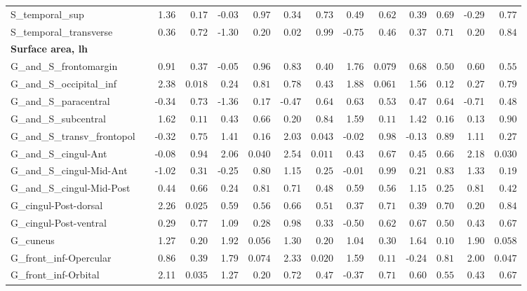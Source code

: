 {\begin{longtable}{llrrrrrrrrrrrr}
S\_temporal\_sup &  & 1.36 & $0.17$ & -0.03 & $0.97$ & 0.34 & $0.73$ & 0.49 & $0.62$ & 0.39 & $0.69$ & -0.29 & $0.77$ \\
S\_temporal\_transverse &  & 0.36 & $0.72$ & -1.30 & $0.20$ & 0.02 & $0.99$ & -0.75 & $0.46$ & 0.37 & $0.71$ & 0.20 & $0.84$ \\
\midrule\multicolumn{14}{l}{\textbf{Surface area, lh}} \\
G\_and\_S\_frontomargin &  & 0.91 & $0.37$ & -0.05 & $0.96$ & 0.83 & $0.40$ & 1.76 & $0.079$ & 0.68 & $0.50$ & 0.60 & $0.55$ \\
G\_and\_S\_occipital\_inf &  & 2.38 & $0.018$ & 0.24 & $0.81$ & 0.78 & $0.43$ & 1.88 & $0.061$ & 1.56 & $0.12$ & 0.27 & $0.79$ \\
G\_and\_S\_paracentral &  & -0.34 & $0.73$ & -1.36 & $0.17$ & -0.47 & $0.64$ & 0.63 & $0.53$ & 0.47 & $0.64$ & -0.71 & $0.48$ \\
G\_and\_S\_subcentral &  & 1.62 & $0.11$ & 0.43 & $0.66$ & 0.20 & $0.84$ & 1.59 & $0.11$ & 1.42 & $0.16$ & 0.13 & $0.90$ \\
G\_and\_S\_transv\_frontopol &  & -0.32 & $0.75$ & 1.41 & $0.16$ & 2.03 & $0.043$ & -0.02 & $0.98$ & -0.13 & $0.89$ & 1.11 & $0.27$ \\
G\_and\_S\_cingul-Ant &  & -0.08 & $0.94$ & 2.06 & $0.040$ & 2.54 & $0.011$ & 0.43 & $0.67$ & 0.45 & $0.66$ & 2.18 & $0.030$ \\
G\_and\_S\_cingul-Mid-Ant &  & -1.02 & $0.31$ & -0.25 & $0.80$ & 1.15 & $0.25$ & -0.01 & $0.99$ & 0.21 & $0.83$ & 1.33 & $0.19$ \\
G\_and\_S\_cingul-Mid-Post &  & 0.44 & $0.66$ & 0.24 & $0.81$ & 0.71 & $0.48$ & 0.59 & $0.56$ & 1.15 & $0.25$ & 0.81 & $0.42$ \\
G\_cingul-Post-dorsal &  & 2.26 & $0.025$ & 0.59 & $0.56$ & 0.66 & $0.51$ & 0.37 & $0.71$ & 0.39 & $0.70$ & 0.20 & $0.84$ \\
G\_cingul-Post-ventral &  & 0.29 & $0.77$ & 1.09 & $0.28$ & 0.98 & $0.33$ & -0.50 & $0.62$ & 0.67 & $0.50$ & 0.43 & $0.67$ \\
G\_cuneus &  & 1.27 & $0.20$ & 1.92 & $0.056$ & 1.30 & $0.20$ & 1.04 & $0.30$ & 1.64 & $0.10$ & 1.90 & $0.058$ \\
G\_front\_inf-Opercular &  & 0.86 & $0.39$ & 1.79 & $0.074$ & 2.33 & $0.020$ & 1.59 & $0.11$ & -0.24 & $0.81$ & 2.00 & $0.047$ \\
G\_front\_inf-Orbital &  & 2.11 & $0.035$ & 1.27 & $0.20$ & 0.72 & $0.47$ & -0.37 & $0.71$ & 0.60 & $0.55$ & 0.43 & $0.67$ \\

\end{longtable}}
